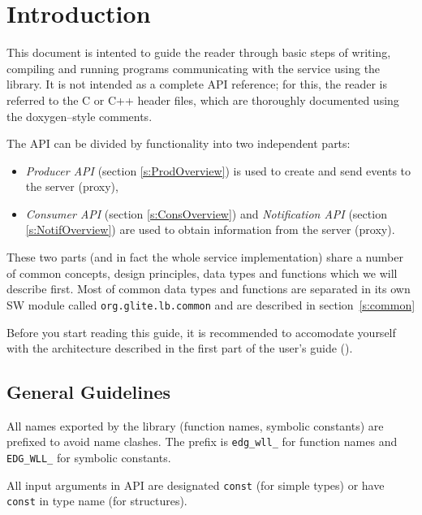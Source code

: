 
\section{Introduction}

This document is intented to guide the reader through basic steps
of writing, compiling and running programs communicating with the \LB
service using the \LB library. It is not intended as a complete API
reference; for this, the reader is referred to the C or C++ header
files, which are thoroughly documented using the doxygen--style
comments. 

The \LB API can be divided by functionality into two independent
parts:
\begin{itemize}
\item \textit{\LB Producer API} (section \ref{s:ProdOverview}) is used
to create and send events to the \LB server (proxy),
\item \textit{\LB Consumer API} (section \ref{s:ConsOverview}) and \textit{\LB
Notification API} (section \ref{s:NotifOverview}) are used to obtain
information from the  \LB server (proxy).
\end{itemize}
These two parts (and in fact the whole \LB service implementation)
share a number of common concepts, design principles, data types and
functions which we will describe first. Most of common data types and
functions are separated in its own SW module called
\texttt{org.glite.lb.common} and are described in section~\ref{s:common}

Before you start reading this guide, it is recommended to accomodate
yourself with the \LB architecture described in the first part of the
\LB user's guide (\cite{LBUG}).



\subsection{General Guidelines}

All names exported by the \LB library (function names, symbolic
constants) are prefixed to avoid name clashes. The prefix is
\lstinline'edg_wll_' for function names and \lstinline'EDG_WLL_' for
symbolic constants.

All input arguments in \LB API are designated \lstinline'const' (for simple
types) or have \texttt{const} in type name (for structures).

